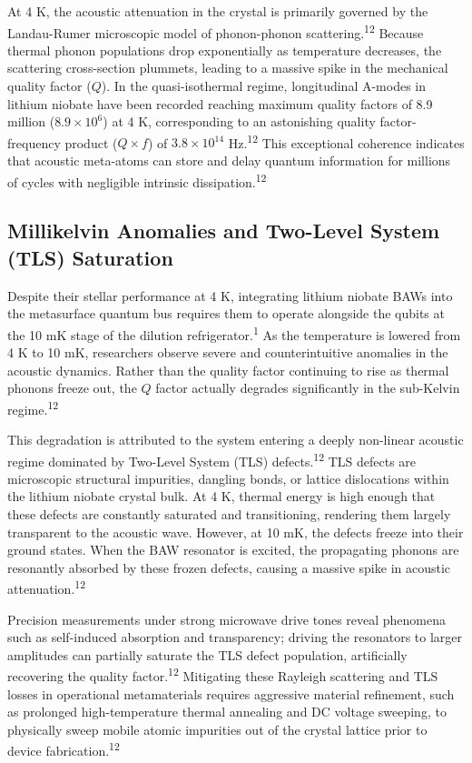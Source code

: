 \documentclass[11pt, a4paper]{article}
\begin{document}
At 4 K, the acoustic attenuation in the crystal is primarily governed by the Landau-Rumer microscopic model of phonon-phonon scattering.\textsuperscript{12} Because thermal phonon populations drop exponentially as temperature decreases, the scattering cross-section plummets, leading to a massive spike in the mechanical quality factor ($Q$). In the quasi-isothermal regime, longitudinal A-modes in lithium niobate have been recorded reaching maximum quality factors of 8.9 million ($8.9 \times 10^6$) at 4 K, corresponding to an astonishing quality factor-frequency product ($Q \times f$) of $3.8 \times 10^{14}$ Hz.\textsuperscript{12} This exceptional coherence indicates that acoustic meta-atoms can store and delay quantum information for millions of cycles with negligible intrinsic dissipation.\textsuperscript{12}

\subsection*{Millikelvin Anomalies and Two-Level System (TLS) Saturation}

Despite their stellar performance at 4 K, integrating lithium niobate BAWs into the metasurface quantum bus requires them to operate alongside the qubits at the 10 mK stage of the dilution refrigerator.\textsuperscript{1} As the temperature is lowered from 4 K to 10 mK, researchers observe severe and counterintuitive anomalies in the acoustic dynamics. Rather than the quality factor continuing to rise as thermal phonons freeze out, the $Q$ factor actually degrades significantly in the sub-Kelvin regime.\textsuperscript{12}

This degradation is attributed to the system entering a deeply non-linear acoustic regime dominated by Two-Level System (TLS) defects.\textsuperscript{12} TLS defects are microscopic structural impurities, dangling bonds, or lattice dislocations within the lithium niobate crystal bulk. At 4 K, thermal energy is high enough that these defects are constantly saturated and transitioning, rendering them largely transparent to the acoustic wave. However, at 10 mK, the defects freeze into their ground states. When the BAW resonator is excited, the propagating phonons are resonantly absorbed by these frozen defects, causing a massive spike in acoustic attenuation.\textsuperscript{12}

Precision measurements under strong microwave drive tones reveal phenomena such as self-induced absorption and transparency; driving the resonators to larger amplitudes can partially saturate the TLS defect population, artificially recovering the quality factor.\textsuperscript{12} Mitigating these Rayleigh scattering and TLS losses in operational metamaterials requires aggressive material refinement, such as prolonged high-temperature thermal annealing and DC voltage sweeping, to physically sweep mobile atomic impurities out of the crystal lattice prior to device fabrication.\textsuperscript{12}
\end{document}

